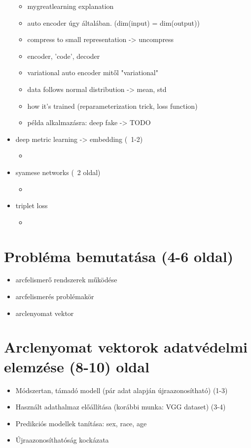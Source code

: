 \begin{itemize}
	\begin{itemize}
		\item mygreatlearning explanation
		\item auto encoder úgy általában. (dim(input) = dim(output))
		\item compress to small representation -> uncompress
		\item encoder, 'code', decoder
		\item variational auto encoder mitől "variational"
		\item data follows normal distribution -> mean, std
		\item how it's trained (reparameterization trick, loss function)
		\item példa alkalmazásra: deep fake -> TODO
	\end{itemize}

	\item deep metric learning -> embedding (~1-2)
	\begin{itemize}
		\item 
	\end{itemize}
	\item syamese networks (~2 oldal)
	\begin{itemize}
		\item 
	\end{itemize}
	\item triplet loss
	\begin{itemize}
		\item 
	\end{itemize}
\end{itemize}

\section{Probléma bemutatása (4-6 oldal)} 
\begin{itemize}
	\item arcfelismerő rendszerek működése
	\item arcfelismerés problémakör
	\item arclenyomat vektor
\end{itemize}

\section{Arclenyomat vektorok adatvédelmi elemzése (8-10) oldal}
\begin{itemize}
	\item Módszertan, támadó modell (pár adat alapján újraazonosítható) (1-3) 
	\item Használt adathalmaz előállítása (korábbi munka:
	VGG dataset) (3-4)
	\item Predikciós modellek tanítása: sex, race, age 
	\item Újraazonosíthatóság kockázata
\end{itemize}

